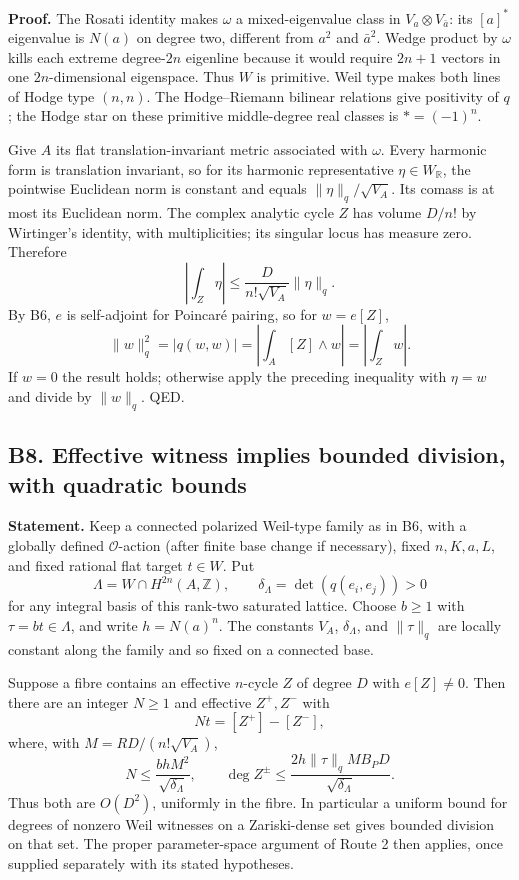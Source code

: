 \documentclass[11pt,a4paper]{article}
\theoremstyle{definition}
\begin{document}
\textbf{Proof.} The Rosati identity makes \(\omega\) a mixed-eigenvalue class in \(V_a\otimes V_{\bar a}\): its \([a]^*\) eigenvalue is \(N(a)\) on degree two, different from \(a^2\) and \(\bar a^2\). Wedge product by \(\omega\) kills each extreme degree-\(2n\) eigenline because it would require \(2n+1\) vectors in one \(2n\)-dimensional eigenspace. Thus \(W\) is primitive. Weil type makes both lines of Hodge type \((n,n)\). The Hodge--Riemann bilinear relations give positivity of \(q\); the Hodge star on these primitive middle-degree real classes is \(*=(-1)^n\).

Give \(A\) its flat translation-invariant metric associated with \(\omega\). Every harmonic form is translation invariant, so for its harmonic representative \(\eta\in W_\mathbb R\), the pointwise Euclidean norm is constant and equals \(\|\eta\|_q/\sqrt{V_A}\). Its comass is at most its Euclidean norm. The complex analytic cycle \(Z\) has volume \(D/n!\) by Wirtinger's identity, with multiplicities; its singular locus has measure zero. Therefore \[
 \left|\int_Z\eta\right|\leq\frac{D}{n!\sqrt{V_A}}\|\eta\|_q.
\] By B6, \(e\) is self-adjoint for Poincaré pairing, so for \(w=e[Z]\), \[
 \|w\|_q^2=|q(w,w)|=\left|\int_A[Z]\wedge w\right|=\left|\int_Zw\right|.
\] If \(w=0\) the result holds; otherwise apply the preceding inequality with \(\eta=w\) and divide by \(\|w\|_q\). QED.

\subsection{B8. Effective witness implies bounded division, with quadratic bounds}\label{b8.-effective-witness-implies-bounded-division-with-quadratic-bounds}

\textbf{Statement.} Keep a connected polarized Weil-type family as in B6, with a globally defined \(\mathcal O\)-action (after finite base change if necessary), fixed \(n,K,a,L\), and fixed rational flat target \(t\in W\). Put \[
 \Lambda=W\cap H^{2n}(A,\mathbb Z),\qquad \delta_\Lambda=\det(q(e_i,e_j))>0
\] for any integral basis of this rank-two saturated lattice. Choose \(b\geq1\) with \(\tau=bt\in\Lambda\), and write \(h=N(a)^n\). The constants \(V_A\), \(\delta_\Lambda\), and \(\|\tau\|_q\) are locally constant along the family and so fixed on a connected base.

Suppose a fibre contains an effective \(n\)-cycle \(Z\) of degree \(D\) with \(e[Z]\ne0\). Then there are an integer \(N\geq1\) and effective \(Z^+,Z^-\) with \[
 Nt=[Z^+]-[Z^-],
\] where, with \(M=RD/(n!\sqrt{V_A})\), \[
 N\leq\frac{b h M^2}{\sqrt{\delta_\Lambda}},\qquad
 \deg Z^\pm\leq\frac{2h\|\tau\|_q M B_P D}{\sqrt{\delta_\Lambda}}.
\] Thus both are \(O(D^2)\), uniformly in the fibre. In particular a uniform bound for degrees of nonzero Weil witnesses on a Zariski-dense set gives bounded division on that set. The proper parameter-space argument of Route 2 then applies, once supplied separately with its stated hypotheses.
\end{document}
